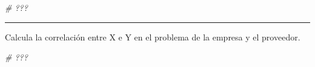 \documentclass[
]{article}
\newenvironment{Shaded}{\begin{snugshade}}{\end{snugshade}}
\newcommand{\CommentTok}[1]{\textcolor[rgb]{0.56,0.35,0.01}{\textit{#1}}}
\begin{document}
\begin{Shaded}
\begin{Highlighting}[]
\CommentTok{\# ???}
\end{Highlighting}
\end{Shaded}

\begin{center}\rule{0.5\linewidth}{0.5pt}\end{center}

Calcula la correlación entre X e Y en el problema de la empresa y el
proveedor.

\begin{Shaded}
\begin{Highlighting}[]
\CommentTok{\# ???}
\end{Highlighting}
\end{Shaded}
\end{document}
